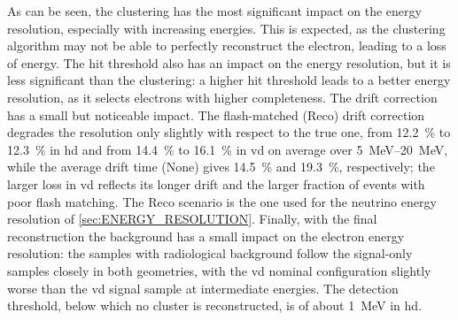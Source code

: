 As can be seen, the clustering has the most significant impact on the energy resolution, especially with increasing energies. This is expected, as the clustering algorithm may not be able to perfectly reconstruct the electron, leading to a loss of energy. The hit threshold also has an impact on the energy resolution, but it is less significant than the clustering: a higher hit threshold leads to a better energy resolution, as it selects electrons with higher completeness. The drift correction has a small but noticeable impact. The flash-matched (Reco) drift correction degrades the resolution only slightly with respect to the true one, from \SI{12.2}{\percent} to \SI{12.3}{\percent} in \gls{hd} and from \SI{14.4}{\percent} to \SI{16.1}{\percent} in \gls{vd} on average over \qtyrange{5}{20}{\mega\electronvolt}, while the average drift time (None) gives \SI{14.5}{\percent} and \SI{19.3}{\percent}, respectively; the larger loss in \gls{vd} reflects its longer drift and the larger fraction of events with poor flash matching. The Reco scenario is the one used for the neutrino energy resolution of \cref{sec:ENERGY_RESOLUTION}. Finally, with the final reconstruction the background has a small impact on the electron energy resolution: the samples with radiological background follow the signal-only samples closely in both geometries, with the \gls{vd} nominal configuration slightly worse than the \gls{vd} signal sample at intermediate energies. The detection threshold, below which no cluster is reconstructed, is of about \SI{1}{\mega\electronvolt} in \gls{hd}.
